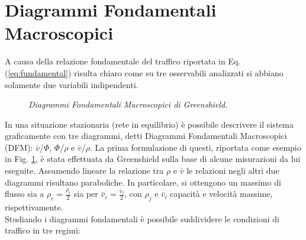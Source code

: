 \section{Diagrammi Fondamentali Macroscopici}
A causa della relazione fondamentale del traffico riportata in Eq. (\ref{eq:fundamental}) risulta chiaro come su tre osservabili analizzati si abbiano solamente due variabili indipendenti.
\begin{figure}[H]
\centering
{}
\caption[DFM di Greenshield]{\emph{Diagrammi Fondamentali Macroscopici di Greenshield.}}
\label{fig:greenshield}
\end{figure}
In una situazione stazionaria (rete in equilibrio) \`e possibile descrivere il sistema graficamente con tre diagrammi, detti Diagrammi Fondamentali Macroscopici (DFM): $\bar{v}$/$\Phi$, $\Phi$/$\rho$ e $\bar{v}$/$\rho$.
La prima formulazione di questi, riportata come esempio in Fig. \ref{fig:greenshield}, \`e stata effettuata da Greenshield sulla base di alcune misurazioni da lui eseguite.
Assumendo lineare la relazione tra $\rho$ e $\bar{v}$ le relazioni negli altri due diagrammi risultano paraboliche.
In particolare, si ottengono un massimo di flusso sia a $\rho_c=\frac{\rho_t}{2}$ sia per $\bar{v}_c=\frac{\bar{v}_l}{2}$, con $\rho_j$ e $\bar{v}_l$ capacit\`a e velocit\`a massime, rispettivamente.
\\Studiando i diagrammi fondamentali \`e possibile suddividere le condizioni di traffico in tre regimi:
